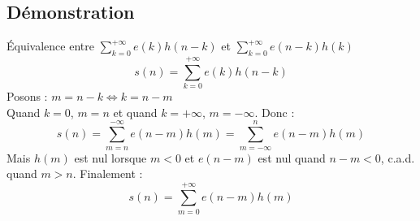 \documentclass[a4paper,11pt]{beamer}
\begin{document}
\subsection{Démonstration}
\begin{frame}
\begin{block}{Équivalence entre $\sum_{k=0}^{+\infty} e(k)h(n-k)$ et
$\sum_{k=0}^{+\infty} e(n-k)h(k)$}
\justifying
$$
\boxed{
s(n) = \sum_{k=0}^{+\infty} e(k)h(n-k)
}
$$
Posons : $m=n-k \Leftrightarrow k=n-m$\\
Quand $k=0$, $m=n$ et quand $k=+\infty$, $m=-\infty$. Donc :\\
$$
s(n) = \sum_{m=n}^{-\infty} e(n-m)h(m) = \sum_{m=-\infty}^{n} e(n-m)h(m)
$$
Mais $h(m)$ est nul lorsque $m<0$ et $e(n-m)$ est nul quand $n-m<0$, c.a.d.
quand $m>n$. Finalement :\\
$$
\boxed{
s(n) = \sum_{m=0}^{+\infty} e(n-m)h(m)
}
$$
\end{block}
\end{frame}
 
 
\end{document}
